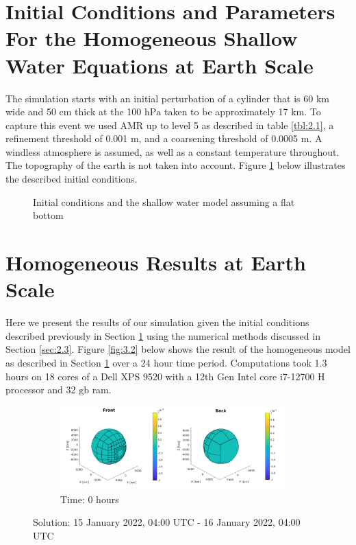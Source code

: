 \documentclass[twoside]{bsu-ms}
\begin{document}
\section{Initial Conditions and Parameters For the Homogeneous Shallow Water Equations at Earth Scale}\label{sec:3.1}
 The simulation starts with an initial perturbation of a cylinder that is 60 km wide and 50 cm thick at the 100 $\mathrm{hPa}$ taken to be approximately 17 $\mathrm{km}$. To capture this event we used AMR up to level 5 as described in table \ref{tbl:2.1}, a refinement threshold of 0.001 $\mathrm{m}$, and a coarsening threshold of 0.0005 $\mathrm{m}$. A windless atmosphere is assumed, as well as a constant temperature throughout. The topography of the earth is not taken into account. Figure \ref{fig:3.1} below illustrates the described initial conditions.
\begin{figure}[!htbp]
	\centering
	
	\caption{Initial conditions and the shallow water model assuming a flat bottom}
	\label{fig:3.1}
\end{figure}
\section{Homogeneous Results at Earth Scale}\label{sec:3.2}
    Here we present the results of our simulation given the initial conditions described previously in Section \ref{sec:3.1} using the numerical methods discussed in Section \ref{sec:2.3}. Figure \ref{fig:3.2} below shows the result of the homogeneous model as described in Section \ref{sec:3.1} over a 24 hour time period. 
    Computations took 1.3 hours on 18 cores of a Dell XPS 9520 with a 12th Gen Intel core i7-12700 $\mathrm{H}$ processor and 32 $\mathrm{gb}$ ram. 
\begin{figure}[!htbp]
\centering
\begin{subfigure}{\textwidth}
  \centering
  \includegraphics[width=0.95\textwidth,clip=True,trim=4cm 0cm 4cm 0cm]{images/ideal/ideal_0.png}
  \caption{Time: 0 hours }
\end{subfigure}
\caption{Solution: 15 January 2022, 04:00 $\mathrm{UTC}$ - 16 January 2022, 04:00 $\mathrm{UTC}$}
\end{figure}
\end{document}
